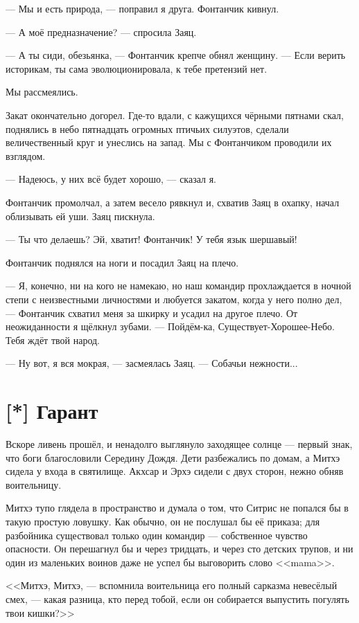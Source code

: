 --- Мы и есть природа, --- поправил я друга.
Фонтанчик кивнул.

--- А моё предназначение? --- спросила Заяц.

--- А ты сиди, обезьянка, --- Фонтанчик крепче обнял женщину.
--- Если верить историкам, ты сама эволюционировала, к тебе претензий нет.

Мы рассмеялись.

Закат окончательно догорел.
Где-то вдали, с кажущихся чёрными пятнами скал, поднялись в небо пятнадцать огромных птичьих силуэтов, сделали величественный круг и унеслись на запад.
Мы с Фонтанчиком проводили их взглядом.

--- Надеюсь, у них всё будет хорошо, --- сказал я.

Фонтанчик промолчал, а затем весело рявкнул и, схватив Заяц в охапку, начал облизывать ей уши.
Заяц пискнула.

--- Ты что делаешь?
Эй, хватит!
Фонтанчик!
У тебя язык шершавый!

Фонтанчик поднялся на ноги и посадил Заяц на плечо.

--- Я, конечно, ни на кого не намекаю, но наш командир прохлаждается в ночной степи с неизвестными личностями и любуется закатом, когда у него полно дел, --- Фонтанчик схватил меня за шкирку и усадил на другое плечо.
От неожиданности я щёлкнул зубами.
--- Пойдём-ка, Существует-Хорошее-Небо.
Тебя ждёт твой народ.

--- Ну вот, я вся мокрая, --- засмеялась Заяц.
--- Собачьи нежности...

\section{[*] Гарант}

Вскоре ливень прошёл, и ненадолго выглянуло заходящее солнце --- первый знак, что боги благословили Середину Дождя.
Дети разбежались по домам, а Митхэ сидела у входа в святилище.
Акхсар и Эрхэ сидели с двух сторон, нежно обняв воительницу.

Митхэ тупо глядела в пространство и думала о том, что Ситрис не попался бы в такую простую ловушку.
Как обычно, он не послушал бы её приказа;
для разбойника существовал только один командир --- собственное чувство опасности.
Он перешагнул бы и через тридцать, и через сто детских трупов, и ни один из маленьких воинов даже не успел бы выговорить слово <<mama>>.

<<Митхэ, Митхэ, --- вспомнила воительница его полный сарказма невесёлый смех, --- какая разница, кто перед тобой, если он собирается выпустить погулять твои кишки?>>

